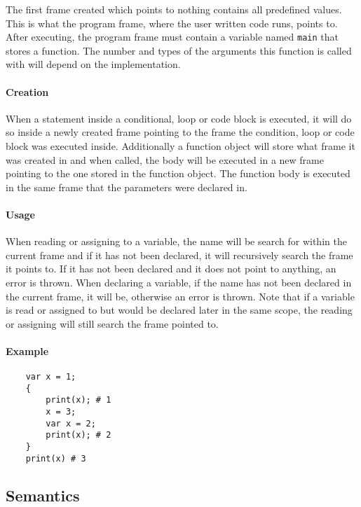 \documentclass[12pt, a4paper]{article}
\begin{document}
The first frame created which points to nothing contains all predefined values. This is what the program frame, where the user written code runs, points to. After executing, the program frame must contain a variable named \verb|main| that stores a function. The number and types of the arguments this function is called with will depend on the implementation.

\paragraph{Creation}

When a statement inside a conditional, loop or code block is executed, it will do so inside a newly created frame pointing to the frame the condition, loop or code block was executed inside. Additionally a function object will store what frame it was created in and when called, the body will be executed in a new frame pointing to the one stored in the function object. The function body is executed in the same frame that the parameters were declared in.

\paragraph{Usage}

When reading or assigning to a variable, the name will be search for within the current frame and if it has not been declared, it will recursively search the frame it points to. If it has not been declared and it does not point to anything, an error is thrown. When declaring a variable, if the name has not been declared in the current frame, it will be, otherwise an error is thrown. Note that if a variable is read or assigned to but would be declared later in the same scope, the reading or assigning will still search the frame pointed to.

\paragraph{Example}

\begin{verbatim}
    var x = 1;
    {
        print(x); # 1
        x = 3;
        var x = 2;
        print(x); # 2
    }
    print(x) # 3
\end{verbatim}

\subsection{Semantics}
\end{document}
